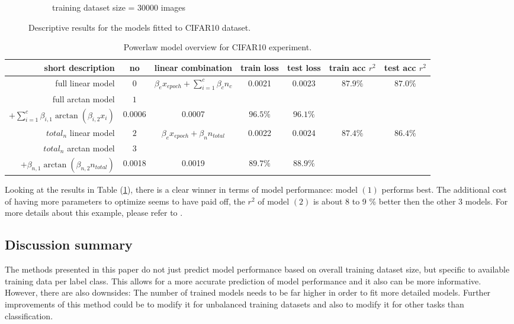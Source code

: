 \documentclass{article} %
\begin{document}
\begin{figure}
\begin{subfigure}{.3\textwidth}
        \caption{training dataset size = $30000$ images}
        \label{fig:subsetsize30000}
    \end{subfigure}%
    \caption{Descriptive results for the models fitted to CIFAR10 dataset.}
    \label{fig:desc_plots_cifar10}
\end{figure}



\begin{table}[h!]
    \centering
    \begin{tabular}{|r|c|c|c|c|c|c|}
        \hline
        short description   & no  & linear combination                               & train loss & test loss & train acc $r^2$ & test acc $r^2$ \\
        \hline
        full linear model          & $0$ & $\beta_e x_{epoch} + \sum_{i = 1}^c \beta_c n_c$ & 0.0021    & 0.0023   & $87.9\%$        & $87.0\%$       \\
        \hline
        full arctan model & $1$& \makecell{$\beta_{e, 1} \arctan{(\beta_{e, 2} x_{epoch})}$ \\  $+ \sum_{i = 1}^c \beta_{i, 1} \arctan{(\beta_{i, 2} x_{i})}$}& 0.0006 & 0.0007 & $96.5\%$ & $96.1\%$ \\
        \hline
        $total_n$ linear model & $2$ & $\beta_e x_{epoch} + \beta_n n_{total}$          & 0.0022    & 0.0024   & $87.4\%$        & $86.4\%$       \\
        \hline
        $total_n$ arctan model &$3$&\makecell{ $\beta_{e, 1} \arctan{(\beta_{e, 2} x_{epoch})}$ \\ $+ \beta_{n, 1} \arctan{(\beta_{n, 2} n_{total})}$} & 0.0018 & 0.0019 & $89.7\%$ & $88.9\%$ \\
        \hline
    \end{tabular}
    \caption{Powerlaw model overview for CIFAR10 experiment.}
    \label{table:cifar_model_overview}
\end{table}

Looking at the results in Table (\ref{table:cifar_model_overview}), there is a clear winner in terms of model performance: model $(1)$ performs best.
The additional cost of having more parameters to optimize seems to have paid off, the $r^2$ of model $(2)$ is about 8 to 9 \% better then the other 3 models. For more details about this example, 
please refer to \cite{muehlenstaedt2024data}.

\subsection*{Discussion summary}

The methods presented in this paper do not just predict model performance based on overall training dataset size, but specific to available training data per label class.
This allows for a more accurate prediction of model performance and it also can be more informative.
However, there are also downsides: The number of trained models needs to be far higher in order to fit more detailed models.
Further improvements of this method could be to modify it for unbalanced training datasets and also to modify it for other tasks than classification.

\pagebreak


\end{document}
